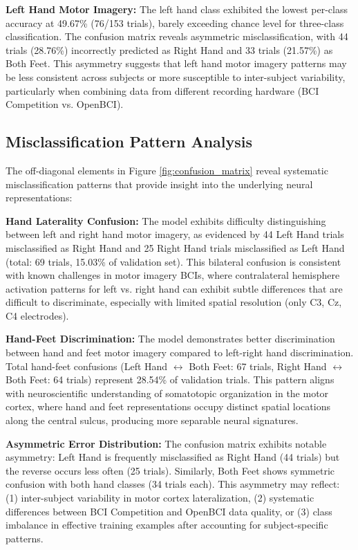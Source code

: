 \textbf{Left Hand Motor Imagery:} The left hand class exhibited the lowest per-class accuracy at 49.67\% (76/153 trials), barely exceeding chance level for three-class classification. The confusion matrix reveals asymmetric misclassification, with 44 trials (28.76\%) incorrectly predicted as Right Hand and 33 trials (21.57\%) as Both Feet. This asymmetry suggests that left hand motor imagery patterns may be less consistent across subjects or more susceptible to inter-subject variability, particularly when combining data from different recording hardware (BCI Competition vs. OpenBCI).

\subsection{Misclassification Pattern Analysis}

The off-diagonal elements in Figure \ref{fig:confusion_matrix} reveal systematic misclassification patterns that provide insight into the underlying neural representations:

\textbf{Hand Laterality Confusion:} The model exhibits difficulty distinguishing between left and right hand motor imagery, as evidenced by 44 Left Hand trials misclassified as Right Hand and 25 Right Hand trials misclassified as Left Hand (total: 69 trials, 15.03\% of validation set). This bilateral confusion is consistent with known challenges in motor imagery BCIs, where contralateral hemisphere activation patterns for left vs. right hand can exhibit subtle differences that are difficult to discriminate, especially with limited spatial resolution (only C3, Cz, C4 electrodes).

\textbf{Hand-Feet Discrimination:} The model demonstrates better discrimination between hand and feet motor imagery compared to left-right hand discrimination. Total hand-feet confusions (Left Hand $\leftrightarrow$ Both Feet: 67 trials, Right Hand $\leftrightarrow$ Both Feet: 64 trials) represent 28.54\% of validation trials. This pattern aligns with neuroscientific understanding of somatotopic organization in the motor cortex, where hand and feet representations occupy distinct spatial locations along the central sulcus, producing more separable neural signatures.

\textbf{Asymmetric Error Distribution:} The confusion matrix exhibits notable asymmetry: Left Hand is frequently misclassified as Right Hand (44 trials) but the reverse occurs less often (25 trials). Similarly, Both Feet shows symmetric confusion with both hand classes (34 trials each). This asymmetry may reflect: (1) inter-subject variability in motor cortex lateralization, (2) systematic differences between BCI Competition and OpenBCI data quality, or (3) class imbalance in effective training examples after accounting for subject-specific patterns.

